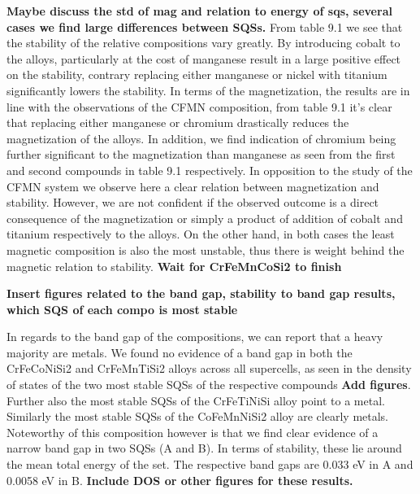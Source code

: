 \textbf{Maybe discuss the std of mag and relation to energy of sqs, several cases we find large differences between SQSs.}
From table 9.1 we see that the stability of the relative compositions vary greatly. By introducing cobalt to the alloys, particularly at the cost of manganese result in a large positive effect on the stability, contrary replacing either manganese or nickel with titanium significantly lowers the stability. In terms of the magnetization, the results are in line with the observations of the CFMN composition, from table 9.1 it's clear that replacing either manganese or chromium drastically reduces the magnetization of the alloys. In addition, we find indication of chromium being further significant to the magnetization than manganese as seen from the first and second compounds in table 9.1 respectively. In opposition to the study of the CFMN system we observe here a clear relation between magnetization and stability. However, we are not confident if the observed outcome is a direct consequence of the magnetization or simply a product of addition of cobalt and titanium respectively to the alloys. On the other hand, in both cases the least magnetic composition is also the most unstable, thus there is weight behind the magnetic relation to stability. \textbf{Wait for CrFeMnCoSi2 to finish}  
  
\textbf{Insert figures related to the band gap, stability to band gap results, which SQS of each compo is most stable}  

In regards to the band gap of the compositions, we can report that a heavy majority are metals. We found no evidence of a band gap in both the CrFeCoNiSi2 and CrFeMnTiSi2 alloys across all supercells, as seen in the density of states of the two most stable SQSs of the respective compounds \textbf{Add figures}. Further also the most stable SQSs of the CrFeTiNiSi alloy point to a metal. Similarly the most stable SQSs of the CoFeMnNiSi2 alloy are clearly metals. Noteworthy of this composition however is that we find clear evidence of a narrow band gap in two SQSs (A and B). In terms of stability, these lie around the mean total energy of the set. The respective band gaps are 0.033 eV in A and 0.0058 eV in B. \textbf{Include DOS or other figures for these results.} 

